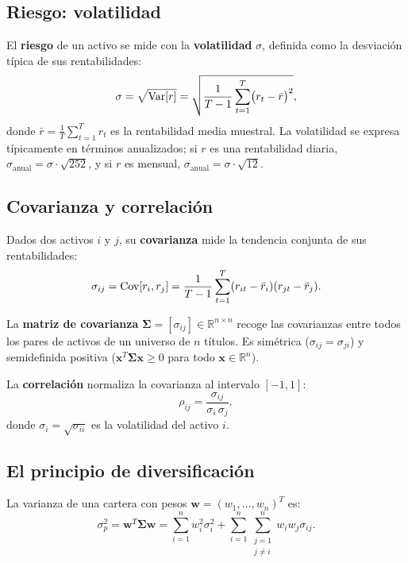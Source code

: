 \subsection{Riesgo: volatilidad}

El \textbf{riesgo} de un activo se mide con la \textbf{volatilidad}
$\sigma$, definida como la desviación típica de sus rentabilidades:
\begin{equation}
    \sigma = \sqrt{\mathop{\textnormal{Var}}\nolimits[r]} = \sqrt{\frac{1}{T-1} \sum_{t=1}^{T}
    \bigl(r_t - \bar{r}\bigr)^2},
    \label{eq:volatilidad}
\end{equation}
donde $\bar{r} = \frac{1}{T}\sum_{t=1}^T r_t$ es la rentabilidad media
muestral. La volatilidad se expresa típicamente en términos anualizados;
si $r$ es una rentabilidad diaria, $\sigma_{\text{anual}} = \sigma \cdot
\sqrt{252}$, y si $r$ es mensual, $\sigma_{\text{anual}} = \sigma \cdot
\sqrt{12}$.

\subsection{Covarianza y correlación}

Dados dos activos $i$ y $j$, su \textbf{covarianza} mide la tendencia
conjunta de sus rentabilidades:
\begin{equation}
    \sigma_{ij} = \mathop{\textnormal{Cov}}\nolimits[r_i, r_j]
    = \frac{1}{T-1} \sum_{t=1}^{T} (r_{it} - \bar{r}_i)(r_{jt} - \bar{r}_j).
    \label{eq:covarianza}
\end{equation}

La \textbf{matriz de covarianza} $\boldsymbol{\Sigma} = [\sigma_{ij}] \in
\mathbb{R}^{n \times n}$ recoge las covarianzas entre todos los pares de
activos de un universo de $n$ títulos. Es simétrica ($\sigma_{ij} =
\sigma_{ji}$) y semidefinida positiva ($\mathbf{x}^T \boldsymbol{\Sigma}
\mathbf{x} \ge 0$ para todo $\mathbf{x} \in \mathbb{R}^n$).

La \textbf{correlación} normaliza la covarianza al intervalo $[-1, 1]$:
\begin{equation}
    \rho_{ij} = \frac{\sigma_{ij}}{\sigma_i \, \sigma_j},
    \label{eq:correlacion}
\end{equation}
donde $\sigma_i = \sqrt{\sigma_{ii}}$ es la volatilidad del activo $i$.

\subsection{El principio de diversificación}

La varianza de una cartera con pesos $\mathbf{w} = (w_1, \dots, w_n)^T$
es:
\begin{equation}
    \sigma_p^2 = \mathbf{w}^T \boldsymbol{\Sigma} \mathbf{w}
    = \sum_{i=1}^{n} w_i^2 \sigma_i^2
    + \sum_{i=1}^{n} \sum_{\substack{j=1 \\ j \neq i}}^{n} w_i w_j \sigma_{ij}.
    \label{eq:varianza-cartera}
\end{equation}

